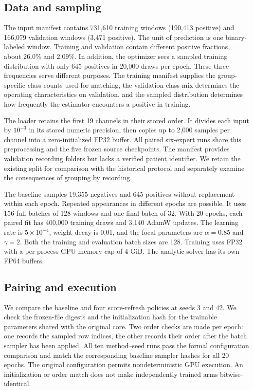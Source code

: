 \documentclass{article}
\begin{document}
\subsection{Data and sampling}
The input manifest contains 731,610 training windows (190,413 positive) and 166,079 validation windows (3,471 positive). The unit of prediction is one binary-labeled window. Training and validation contain different positive fractions, about 26.0\% and 2.09\%. In addition, the optimizer sees a sampled training distribution with only 645 positives in 20,000 draws per epoch. These three frequencies serve different purposes. The training manifest supplies the group-specific class counts used for matching, the validation class mix determines the operating characteristics on validation, and the sampled distribution determines how frequently the estimator encounters a positive in training.

The loader retains the first 19 channels in their stored order. It divides each input by $10^{-3}$ in its stored numeric precision, then copies up to 2,000 samples per channel into a zero-initialized FP32 buffer. All paired six-expert runs share this preprocessing and the five frozen source checkpoints. The manifest provides validation recording folders but lacks a verified patient identifier. We retain the existing split for comparison with the historical protocol and separately examine the consequences of grouping by recording.

The baseline samples 19,355 negatives and 645 positives without replacement within each epoch. Repeated appearances in different epochs are possible. It uses 156 full batches of 128 windows and one final batch of 32. With 20 epochs, each paired fit has 400,000 training draws and 3,140 AdamW updates. The learning rate is $5\times10^{-4}$, weight decay is 0.01, and the focal parameters are $\alpha=0.85$ and $\gamma=2$. Both the training and evaluation batch sizes are 128. Training uses FP32 with a per-process GPU memory cap of 4 GiB. The analytic solver has its own FP64 buffers.

\subsection{Pairing and execution}
We compare the baseline and four score-refresh policies at seeds 3 and 42. We check the frozen-file digests and the initialization hash for the trainable parameters shared with the original core. Two order checks are made per epoch: one records the sampled row indices, the other records their order after the batch sampler has been applied. All ten method--seed runs pass the formal configuration comparison and match the corresponding baseline sampler hashes for all 20 epochs. The original configuration permits nondeterministic GPU execution. An initialization or order match does not make independently trained arms bitwise-identical.
\end{document}
